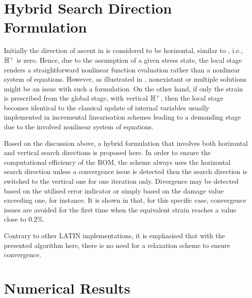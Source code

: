 \section{Hybrid Search Direction Formulation}
\label{sec5_hybrid_search}

Initially the direction of ascent in  is considered to be horizontal, similar to \parencite{allix2002new}, i.e., ${\mathbb{ H}}^+$ is zero. Hence, due to the assumption of a given stress state, the local stage renders a straightforward nonlinear function evaluation rather than a nonlinear system of equations. However, as illustrated in \parencite{vandoren2013novel}, nonexistant or multiple solutions might be an issue with such a formulation. On the other hand, if only the strain is prescribed from the global stage, with vertical ${\mathbb{ H}}^+$, then the local stage becomes identical to the classical update of internal variables usually implemented in incremental linearisation schemes leading to a demanding stage due to the involved nonlinear system of equations.

Based on the discussion above, a hybrid formulation that involves both horizontal and vertical search directions is proposed here. In order to ensure the computational efficiency of the ROM, the scheme always uses the horizontal search direction unless a convergence issue is detected then the search direction is switched to the vertical one for one iteration only. Divergence may be detected based on the utilised error indicator or simply based on the damage value exceeding one, for instance. It is shown in  that, for this specific case, convergence issues are avoided for the first time when the equivalent strain reaches a value close to $0.2\%$.

Contrary to other LATIN implementations, it is emphasised that with the presented algorithm here, there is no need for a relaxation scheme to ensure convergence.

\section{Numerical Results}
\label{sec5_examples}

